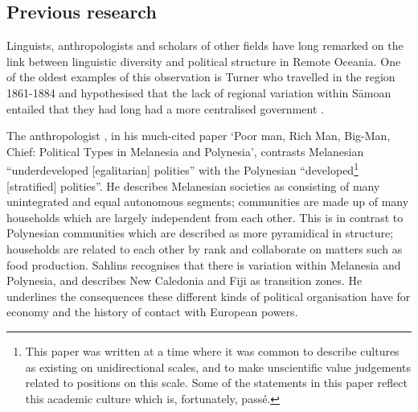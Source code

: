 \documentclass[a4paper,10pt]{article} %
\begin{document}

 
 
\subsection{Previous research}
\label{nonlingfactors}
Linguists, anthropologists and scholars of other fields have long remarked on the link between linguistic diversity and political structure in Remote Oceania. One of the oldest examples of this observation is Turner who travelled in the region 1861-1884 and hypothesised that the lack of regional variation within S\={a}moan entailed that they had long had a more centralised government \citep[172]{turner1884}.


The anthropologist \citet{sahlins63}, in his much-cited paper `Poor man, Rich Man, Big-Man, Chief: Political Types in Melanesia and Polynesia', contrasts Melanesian ``underdeveloped [egalitarian] polities'' with the Polynesian ``developed\footnote{This paper was written at a time where it was common to describe cultures as existing on unidirectional scales, and to make unscientific value judgements related to positions on this scale. Some of the statements in this paper reflect this academic culture which is, fortunately, passé.} [stratified] polities''. He describes Melanesian societies as consisting of many unintegrated and equal autonomous segments; communities are made up of many households which are largely independent from each other. This is in contrast to Polynesian communities which are described as more pyramidical in structure; households are related to each other by rank and collaborate on matters such as food production. Sahlins recognises that there is variation within Melanesia and Polynesia, and describes New Caledonia and Fiji as transition zones. He underlines the consequences these different kinds of political organisation have for economy and the history of contact with European powers.%
\end{document}
